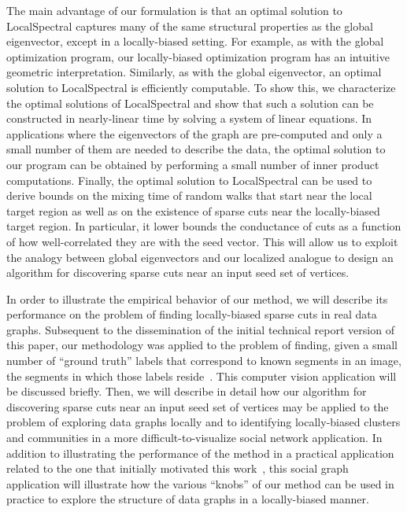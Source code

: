 \documentclass[11pt]{article}
\begin{document}
The main advantage of our formulation is that an optimal solution to 
\textsf{LocalSpectral} captures many of the same structural properties as 
the global eigenvector, except in a locally-biased setting. 
For example, as with the global optimization program, our locally-biased 
optimization program has an intuitive geometric interpretation.
Similarly, as with the global eigenvector, an optimal solution to 
\textsf{LocalSpectral} is efficiently computable. 
To show this, we characterize the optimal solutions of 
\textsf{LocalSpectral} and show that such a solution can be constructed in 
nearly-linear time by solving a system of linear equations.
In applications where the eigenvectors of the graph are pre-computed and 
only a small number of them are needed to describe the data, the optimal 
solution to our program can be obtained by performing a small number of 
inner product computations. 
Finally, the optimal solution to \textsf{LocalSpectral} can be used to 
derive bounds on the mixing time of random walks that start near the local 
target region as well as on the existence of sparse cuts near the 
locally-biased target region. 
In particular, it lower bounds the conductance of cuts as a function of how 
well-correlated they are with the seed vector.
This will allow us to exploit the analogy between global eigenvectors and 
our localized analogue to design an algorithm for discovering sparse cuts 
near an input seed set of vertices. 

In order to illustrate the empirical behavior of our method, we will 
describe its performance on the problem of finding locally-biased sparse 
cuts in real data graphs.
Subsequent to the dissemination of the initial technical report version of 
this paper, our methodology was applied to the problem of finding, given a 
small number of ``ground truth'' labels that correspond to known segments 
in an image, the segments in which those labels reside~\cite{MVM11}.
This computer vision application will be discussed briefly.
Then, we will describe in detail how our algorithm for discovering sparse 
cuts near an input seed set of vertices may be applied to the problem of 
exploring data graphs locally and to identifying locally-biased clusters and 
communities in a more difficult-to-visualize social network application.
In addition to illustrating the performance of the method in a practical 
application related to the one that initially motivated 
this work~\cite{LLDM08_communities_CONF,LLDM09_communities_IM,LLM10_communities_CONF}, 
this social graph application will illustrate how the various ``knobs'' of our method can 
be used in practice to explore the structure of data graphs in a locally-biased 
manner.
\end{document}
